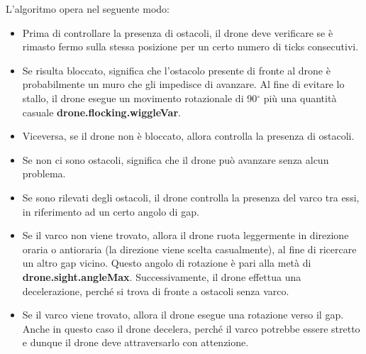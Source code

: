 L’algoritmo opera nel seguente modo:
\begin{itemize}
	\item Prima di controllare la presenza di ostacoli, il drone deve verificare se è rimasto fermo sulla stessa posizione per un certo numero di ticks consecutivi.
	\item Se risulta bloccato, significa che l’ostacolo presente di fronte al drone è probabilmente un muro che gli impedisce di avanzare. 
    Al fine di evitare lo stallo, il drone esegue un movimento rotazionale di 90$^{\circ}$ più una quantità casuale \textbf{drone.flocking.wiggleVar}.
	\item Viceversa, se il drone non è bloccato, allora controlla la presenza di ostacoli.
	\item Se non ci sono ostacoli, significa che il drone può avanzare senza alcun problema.
	\item Se sono rilevati degli ostacoli, il drone controlla la presenza del varco tra essi, in riferimento ad un certo angolo di gap.
	\item Se il varco non viene trovato, allora il drone ruota leggermente in direzione oraria o antioraria (la direzione viene scelta casualmente), al fine di ricercare un altro gap vicino. 
    Questo angolo di rotazione è pari alla metà di \textbf{drone.sight.angleMax}. 
    Successivamente, il drone effettua una decelerazione, perché si trova di fronte a ostacoli senza varco.
	\item Se il varco viene trovato, allora il drone esegue una rotazione verso il gap. 
    Anche in questo caso il drone decelera, perché il varco potrebbe essere stretto e dunque il drone deve attraversarlo con attenzione.
\end {itemize}

